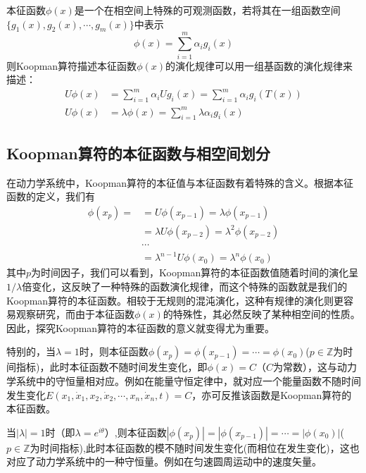 本征函数$\phi(x)$是一个在相空间上特殊的可观测函数，若将其在一组函数空间$\{g_1(x),g_2(x),\cdots,g_m(x)\}$中表示
\begin{equation}
    \phi(x)=\sum_{i=1}^m\alpha_ig_i(x)
\end{equation}
则Koopman算符描述本征函数$\phi(x)$的演化规律可以用一组基函数的演化规律来描述：
\begin{equation}
    \begin{aligned}
        U\phi(x)&=\sum_{i=1}^m\alpha_iUg_i(x)=\sum_{i=1}^m\alpha_ig_i(T(x))\\
        U\phi(x)&=\lambda\phi(x)=\sum_{i=1}^m\lambda\alpha_ig_i(x)
    \end{aligned}
\end{equation}

\subsection{Koopman算符的本征函数与相空间划分}

在动力学系统中，Koopman算符的本征值与本征函数有着特殊的含义。根据本征函数的定义，我们有
\begin{equation}
    \begin{aligned}
        \phi(x_p)=  &=U\phi(x_{p-1})=\lambda\phi(x_{p-1})\\
                    &=\lambda U\phi(x_{p-2})=\lambda^2\phi(x_{p-2})\\
                    &\cdots\\
                    &=\lambda^{n-1}U\phi(x_0)=\lambda^n\phi(x_0)
    \end{aligned}
\end{equation}
其中$p$为时间因子，我们可以看到，Koopman算符的本征函数值随着时间的演化呈$1/\lambda$倍变化，这反映了一种特殊的函数演化规律，而这个特殊的函数就是我们的Koopman算符的本征函数。相较于无规则的混沌演化，这种有规律的演化则更容易观察研究，而由于本征函数$\phi(x)$的特殊性，其必然反映了某种相空间的性质。因此，探究Koopman算符的本征函数的意义就变得尤为重要。

特别的，当$\lambda=1$时，则本征函数$\phi(x_p)=\phi(x_{p-1})=\cdots=\phi(x_{0})$($p\in \mathbb{Z}$为时间指标)，此时本征函数不随时间发生变化，即$\phi(x)=C$（$C$为常数），这与动力学系统中的守恒量相对应。例如在能量守恒定律中，就对应一个能量函数不随时间发生变化$E(x_1,\dot{x}_1,x_2,\dot{x}_2,\cdots,x_n,\dot{x}_n,t)=C$，亦可反推该函数是Koopman算符的本征函数。

当$|\lambda|=1$时（即$\lambda=e^{i\theta}$）,则本征函数$|\phi(x_p)|=|\phi(x_{p-1})|=\cdots=|\phi(x_{0})|$($p\in \mathbb{Z}$为时间指标),此时本征函数的模不随时间发生变化(而相位在发生变化)，这也对应了动力学系统中的一种守恒量。例如在匀速圆周运动中的速度矢量。

